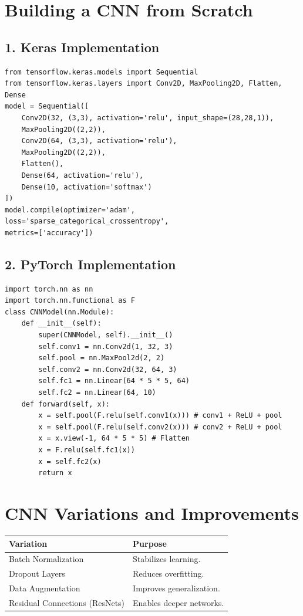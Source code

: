 \documentclass[10pt]{article}
\begin{document}
\section*{Building a CNN from Scratch}
\subsection*{1. Keras Implementation}
\begin{verbatim}
from tensorflow.keras.models import Sequential
from tensorflow.keras.layers import Conv2D, MaxPooling2D, Flatten, Dense
model = Sequential([
    Conv2D(32, (3,3), activation='relu', input_shape=(28,28,1)),
    MaxPooling2D((2,2)),
    Conv2D(64, (3,3), activation='relu'),
    MaxPooling2D((2,2)),
    Flatten(),
    Dense(64, activation='relu'),
    Dense(10, activation='softmax')
])
model.compile(optimizer='adam', loss='sparse_categorical_crossentropy',
metrics=['accuracy'])
\end{verbatim}

\subsection*{2. PyTorch Implementation}
\begin{verbatim}
import torch.nn as nn
import torch.nn.functional as F
class CNNModel(nn.Module):
    def __init__(self):
        super(CNNModel, self).__init__()
        self.conv1 = nn.Conv2d(1, 32, 3)
        self.pool = nn.MaxPool2d(2, 2)
        self.conv2 = nn.Conv2d(32, 64, 3)
        self.fc1 = nn.Linear(64 * 5 * 5, 64)
        self.fc2 = nn.Linear(64, 10)
    def forward(self, x):
        x = self.pool(F.relu(self.conv1(x))) # conv1 + ReLU + pool
        x = self.pool(F.relu(self.conv2(x))) # conv2 + ReLU + pool
        x = x.view(-1, 64 * 5 * 5) # Flatten
        x = F.relu(self.fc1(x))
        x = self.fc2(x)
        return x
\end{verbatim}

\section*{CNN Variations and Improvements}
\begin{center}
\begin{tabular}{|l|l|}
\hline
Variation & Purpose \\
\hline
Batch Normalization & Stabilizes learning. \\
\hline
Dropout Layers & Reduces overfitting. \\
\hline
Data Augmentation & Improves generalization. \\
\hline
Residual Connections (ResNets) & Enables deeper networks. \\
\hline
\end{tabular}
\end{center}
\end{document}
